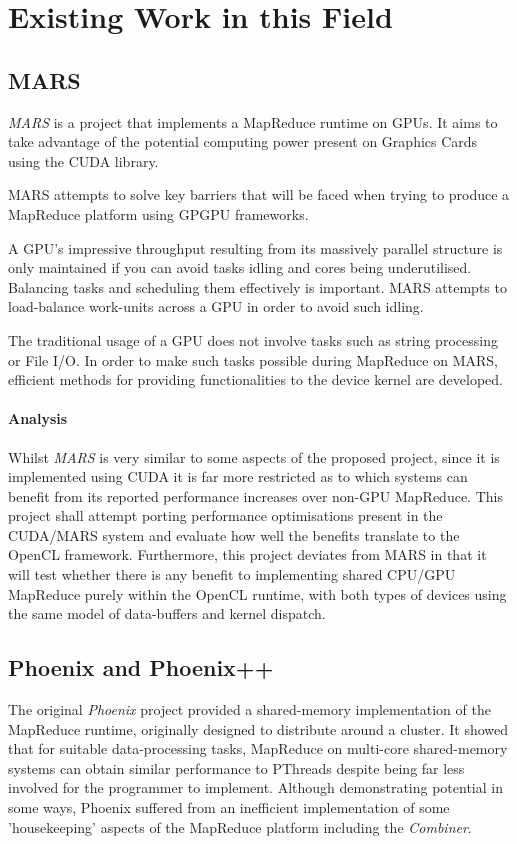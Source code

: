 \section{Existing Work in this Field}
\subsection{MARS}
\emph{MARS} \cite{mars} is a project that implements a MapReduce runtime on \ac{GPUs}. It aims to take advantage of the potential computing power present on Graphics Cards using the \ac{CUDA} library.

MARS attempts to solve key barriers that will be faced when trying to produce a MapReduce platform using \ac{GPGPU} frameworks.

    A GPU's impressive throughput resulting from its massively parallel structure is only maintained if you can avoid tasks idling and cores being underutilised. Balancing tasks and scheduling them effectively is important.
MARS attempts to load-balance work-units across a GPU in order to avoid such idling.

The traditional usage of a GPU does not involve tasks such as string processing or File I/O.
In order to make such tasks possible during MapReduce on MARS, efficient methods for providing functionalities to the device kernel are developed.
\paragraph{Analysis}
Whilst \emph{MARS} is very similar to some aspects of the proposed project, since it is implemented using \ac{CUDA} it is far more restricted as to which systems can benefit from its reported performance increases over non-GPU MapReduce. This project shall attempt porting performance optimisations present in the \ac{CUDA}/MARS system and evaluate how well the benefits translate to the OpenCL framework. Furthermore, this project deviates from MARS in that it will test whether there is any benefit to implementing shared CPU/GPU MapReduce purely within the OpenCL runtime, with both types of devices using the same model of data-buffers and kernel dispatch.
\subsection{Phoenix and Phoenix++}
The original \emph{Phoenix} \cite{phoenix} project provided a shared-memory implementation of the MapReduce runtime, originally designed to distribute around a cluster. It showed that for suitable data-processing tasks, MapReduce on multi-core shared-memory systems can obtain similar performance to PThreads despite being far less involved for the programmer to implement. Although demonstrating potential in some ways, Phoenix suffered from an inefficient implementation of some 'housekeeping' aspects of the MapReduce platform including the \emph{Combiner}.


